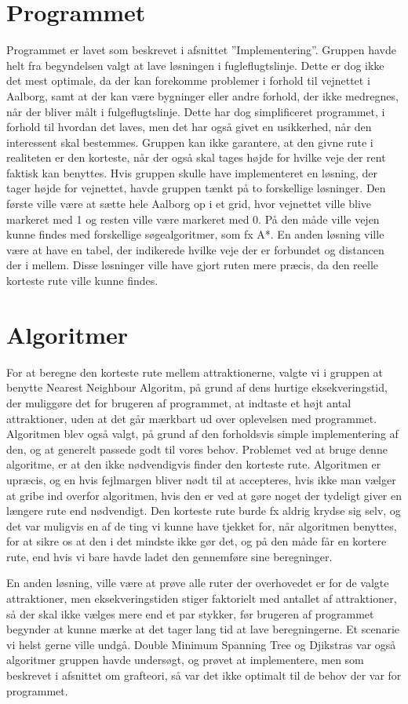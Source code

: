\section{Programmet}
Programmet er lavet som beskrevet i afsnittet ”Implementering”. Gruppen havde helt fra begyndelsen valgt at lave løsningen i fugleflugtslinje. Dette er dog ikke det mest optimale, da der kan forekomme problemer i forhold til vejnettet i Aalborg, samt at der kan være bygninger eller andre forhold, der ikke medregnes, når der bliver målt i fulgeflugtslinje. Dette har dog simplificeret programmet, i forhold til hvordan det laves, men det har også givet en usikkerhed, når den interessent skal bestemmes. Gruppen kan ikke garantere, at den givne rute i realiteten er den korteste, når der også skal tages højde for hvilke veje der rent faktisk kan benyttes. 
Hvis gruppen skulle have implementeret en løsning, der tager højde for vejnettet, havde gruppen tænkt på to forskellige løsninger. Den første ville være at sætte hele Aalborg op i et grid, hvor vejnettet ville blive markeret med 1 og resten ville være markeret med 0. På den måde ville vejen kunne findes med forskellige søgealgoritmer, som fx A*. En anden løsning ville være at have en tabel, der indikerede hvilke veje der er forbundet og distancen der i mellem. Disse løsninger ville have gjort ruten mere præcis, da den reelle korteste rute ville kunne findes. 

\section{Algoritmer}
For at beregne den korteste rute mellem attraktionerne, valgte vi i gruppen at benytte Nearest Neighbour Algoritm, på grund af dens hurtige eksekveringstid, der muliggøre det for brugeren af programmet, at indtaste et højt antal attraktioner, uden at det går mærkbart ud over oplevelsen med programmet. Algoritmen blev også valgt, på grund af den forholdsvis simple implementering af den, og at generelt passede godt til vores behov. Problemet ved at bruge denne algoritme, er at den ikke nødvendigvis finder den korteste rute. Algoritmen er upræcis, og en hvis fejlmargen bliver nødt til at accepteres, hvis ikke man vælger at gribe ind overfor algoritmen, hvis den er ved at gøre noget der tydeligt giver en længere rute end nødvendigt. Den korteste rute burde fx aldrig krydse sig selv, og det var muligvis en af de ting vi kunne have tjekket for, når algoritmen benyttes, for at sikre os at den i det mindste ikke gør det, og på den måde får en kortere rute, end hvis vi bare havde ladet den gennemføre sine beregninger. 

En anden løsning, ville være at prøve alle ruter der overhovedet er for de valgte attraktioner, men eksekveringstiden stiger faktorielt med antallet af attraktioner, så der skal ikke vælges mere end et par stykker, før brugeren af programmet begynder at kunne mærke at det tager lang tid at lave beregningerne. Et scenarie vi helst gerne ville undgå.
Double Minimum Spanning Tree og Djikstras var også algoritmer gruppen havde undersøgt, og prøvet at implementere, men som beskrevet i afsnittet om grafteori, så var det ikke optimalt til de behov der var for programmet. 

